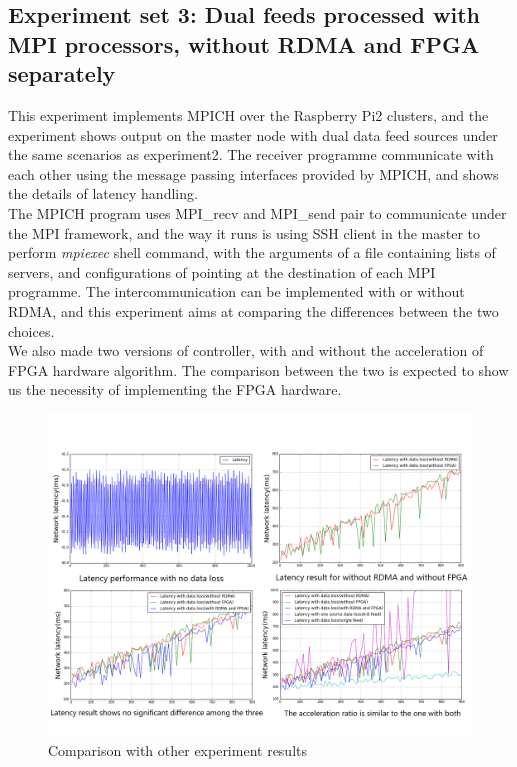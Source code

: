 \documentclass[11pt,openright,a4paper]{report}
\begin{document}
\subsection{Experiment set 3: Dual feeds processed with MPI processors, without RDMA and FPGA separately}
This experiment implements MPICH over the Raspberry Pi2 clusters, and the experiment shows output on the master node with dual data feed sources under the same scenarios as experiment2. The receiver programme communicate with each other using the message passing interfaces provided by MPICH, and shows the details of latency handling.\\
The MPICH program uses MPI\_recv and MPI\_send pair to communicate under the MPI framework, and the way it runs is using SSH client in the master to perform \textit{mpiexec} shell command, with the arguments of a file containing lists of servers, and configurations of pointing at the destination of each MPI programme. The intercommunication can be implemented with or without RDMA, and this experiment aims at comparing the differences between the two choices.\\
We also made two versions of controller, with and without the acceleration of FPGA hardware algorithm. The comparison between the two is expected to show us the necessity of implementing the FPGA hardware.\\
\begin{figure}[H]
	\centering
	\includegraphics[width=1.0\linewidth]{picture/experiments/exp3/delay_overall}
	\caption{Comparison with other experiment results}
	\label{fig:delay_overall}
\end{figure}
\end{document}

